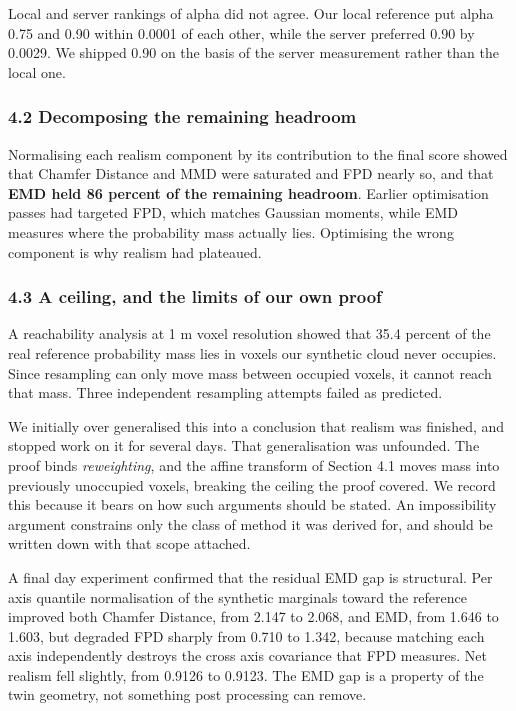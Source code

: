 \documentclass[
  10pt,
]{article}
\begin{document}
Local and server rankings of alpha did not agree. Our local reference
put alpha 0.75 and 0.90 within 0.0001 of each other, while the server
preferred 0.90 by 0.0029. We shipped 0.90 on the basis of the server
measurement rather than the local one.

\subsubsection{4.2 Decomposing the remaining
headroom}\label{decomposing-the-remaining-headroom}

Normalising each realism component by its contribution to the final
score showed that Chamfer Distance and MMD were saturated and FPD nearly
so, and that \textbf{EMD held 86 percent of the remaining headroom}.
Earlier optimisation passes had targeted FPD, which matches Gaussian
moments, while EMD measures where the probability mass actually lies.
Optimising the wrong component is why realism had plateaued.

\subsubsection{4.3 A ceiling, and the limits of our own
proof}\label{a-ceiling-and-the-limits-of-our-own-proof}

A reachability analysis at 1 m voxel resolution showed that 35.4 percent
of the real reference probability mass lies in voxels our synthetic
cloud never occupies. Since resampling can only move mass between
occupied voxels, it cannot reach that mass. Three independent resampling
attempts failed as predicted.

We initially over generalised this into a conclusion that realism was
finished, and stopped work on it for several days. That generalisation
was unfounded. The proof binds \emph{reweighting}, and the affine
transform of Section 4.1 moves mass into previously unoccupied voxels,
breaking the ceiling the proof covered. We record this because it bears
on how such arguments should be stated. An impossibility argument
constrains only the class of method it was derived for, and should be
written down with that scope attached.

A final day experiment confirmed that the residual EMD gap is
structural. Per axis quantile normalisation of the synthetic marginals
toward the reference improved both Chamfer Distance, from 2.147 to
2.068, and EMD, from 1.646 to 1.603, but degraded FPD sharply from 0.710
to 1.342, because matching each axis independently destroys the cross
axis covariance that FPD measures. Net realism fell slightly, from
0.9126 to 0.9123. The EMD gap is a property of the twin geometry, not
something post processing can remove.
\end{document}
